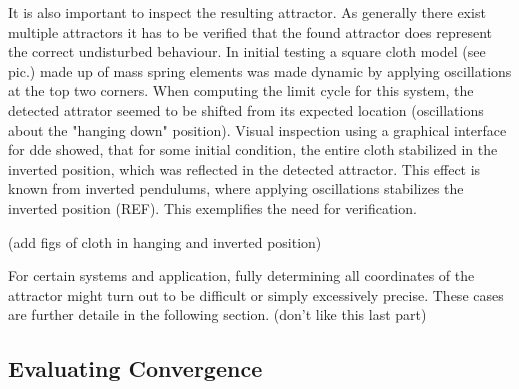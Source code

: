 It is also important to inspect the resulting attractor. As generally there exist multiple attractors it has to be verified that the found attractor does represent the correct undisturbed behaviour. In initial testing a square cloth model (see pic.) made up of mass spring elements was made dynamic by applying oscillations at the top two corners. When computing the limit cycle for this system, the detected attrator seemed to be shifted from its expected location (oscillations about the "hanging down" position). Visual inspection using a graphical interface for dde showed, that 
for some initial condition, the entire cloth stabilized in the inverted position, which was reflected in the detected attractor. This effect is known from inverted pendulums, where applying oscillations stabilizes the inverted position (REF). This exemplifies the need for verification.  

(add figs of cloth in hanging and inverted position)

For certain systems and application, fully determining all coordinates of the attractor might turn out to be difficult or simply excessively precise. These cases are further detaile in the following section. (don't like this last part)


    

\subsection{Evaluating Convergence}
    
